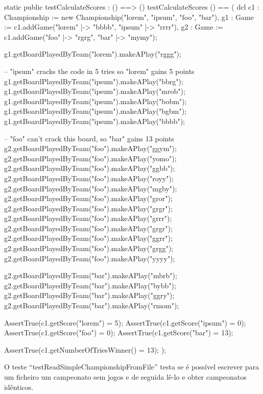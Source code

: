 \begin{vdm_al}  
    static public testCalculateScores : () ==> ()
    testCalculateScores () == (
        dcl c1 : Championship := new Championship({"lorem", "ipsum", "foo", "bar"}),
        g1 : Game := c1.addGame({"lorem" |-> "bbbb", "ipsum" |-> "rrrr"}),
        g2 : Game := c1.addGame({"foo" |-> "rgrg", "bar" |-> "mymy"});
  
        g1.getBoardPlayedByTeam("lorem").makeAPlay("rggg");
  
        -- "ipsum" cracks the code in 5 tries so "lorem" gains 5 points
        g1.getBoardPlayedByTeam("ipsum").makeAPlay("bbrg");
        g1.getBoardPlayedByTeam("ipsum").makeAPlay("mrob");
        g1.getBoardPlayedByTeam("ipsum").makeAPlay("bobm");
        g1.getBoardPlayedByTeam("ipsum").makeAPlay("bgbm");
        g1.getBoardPlayedByTeam("ipsum").makeAPlay("bbbb");
  
        -- "foo" can't crack this board, so "bar" gains 13 points
        g2.getBoardPlayedByTeam("foo").makeAPlay("ggym");
        g2.getBoardPlayedByTeam("foo").makeAPlay("yomo");
        g2.getBoardPlayedByTeam("foo").makeAPlay("ggbb");
        g2.getBoardPlayedByTeam("foo").makeAPlay("royy");
        g2.getBoardPlayedByTeam("foo").makeAPlay("mgby");
        g2.getBoardPlayedByTeam("foo").makeAPlay("gror");
        g2.getBoardPlayedByTeam("foo").makeAPlay("grgr");
        g2.getBoardPlayedByTeam("foo").makeAPlay("grrr");
        g2.getBoardPlayedByTeam("foo").makeAPlay("grgr");
        g2.getBoardPlayedByTeam("foo").makeAPlay("ggrr");
        g2.getBoardPlayedByTeam("foo").makeAPlay("grgg");
        g2.getBoardPlayedByTeam("foo").makeAPlay("yyyy");
  
        g2.getBoardPlayedByTeam("bar").makeAPlay("mbrb");
        g2.getBoardPlayedByTeam("bar").makeAPlay("bybb");
        g2.getBoardPlayedByTeam("bar").makeAPlay("ggry");
        g2.getBoardPlayedByTeam("bar").makeAPlay("rmom");
  
        AssertTrue(c1.getScore("lorem") = 5);
        AssertTrue(c1.getScore("ipsum") = 0);
        AssertTrue(c1.getScore("foo") = 0);
        AssertTrue(c1.getScore("bar") = 13);
  
        AssertTrue(c1.getNumberOfTriesWinner() = 13);
      );
\end{vdm_al}  

O teste ``testReadSimpleChampionshipFromFile'' testa se é possível
escrever para um ficheiro um campeonato sem jogos e de seguida lê-lo e
obter campeonatos idênticos.

